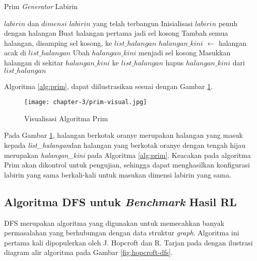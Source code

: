 \begin{algorithm}
	\makeatletter
	\renewcommand{\ALG@name}{Algoritma}
	\makeatother
	\caption{Prim \textit{Generator} Labirin}\label{alg:prim}
	\renewcommand{\algorithmicrequire}{\textbf{Masukan:}}
	\renewcommand{\algorithmicensure}{\textbf{Keluaran:}}
	\begin{algorithmic}[1]
		\Require $labirin$ dan $dimensi$
		\Ensure $labirin$ yang telah terbangun
		\State Inisialisasi $labirin$ penuh dengan halangan
		\State Buat halangan pertama jadi sel kosong
		\State Tambah semua halangan, disamping sel kosong, ke $list\_halangan$
		\State $halangan\_kini$ $\gets$ halangan acak di $list\_halangan$
		\State Ubah $halangan\_kini$ menjadi sel kosong
		\State Masukkan halangan di sekitar $halangan\_kini$ ke $list\_halangan$
		\EndIf
		\State hapus $halangan\_kini$ dari $list\_halangan$
		\EndWhile
	\end{algorithmic}
\end{algorithm}

Algoritma \ref{alg:prim}, dapat diilustrasikan sesuai dengan Gambar \ref{fig:prim-visual}.

\begin{figure}[H]
	\centering
	\texttt{[image: chapter-3/prim-visual.jpg]}
	\caption{Visualisasi Algoritma Prim}
	\label{fig:prim-visual}
\end{figure}

Pada Gambar \ref{fig:prim-visual}, halangan berkotak oranye merupakan halangan yang masuk kepada \textit{list\_halangan}dan halangan yang berkotak oranye dengan tengah hijau merupakan \textit{halangan\_kini} pada Algoritma \ref{alg:prim}. Keacakan pada algoritma Prim akan dikontrol untuk pengujian, sehingga dapat menghasilkan konfigurasi labirin yang sama berkali-kali untuk masukan dimensi labirin yang sama.

\subsection{Algoritma \ac{DFS} untuk \textit{Benchmark} Hasil \acl{RL}}
\label{sec:sub-dfs}

\acf{DFS} merupakan algoritma yang digunakan untuk memecahkan banyak permasalahan yang berhubungan dengan data struktur \textit{graph}. Algoritma ini pertama kali dipopulerkan oleh J. Hopcroft dan R. Tarjan pada \parencite{hopcroft1973algorithm} dengan ilustrasi diagram alir algoritma pada Gambar \ref{fig:hopcroft-dfs}.

